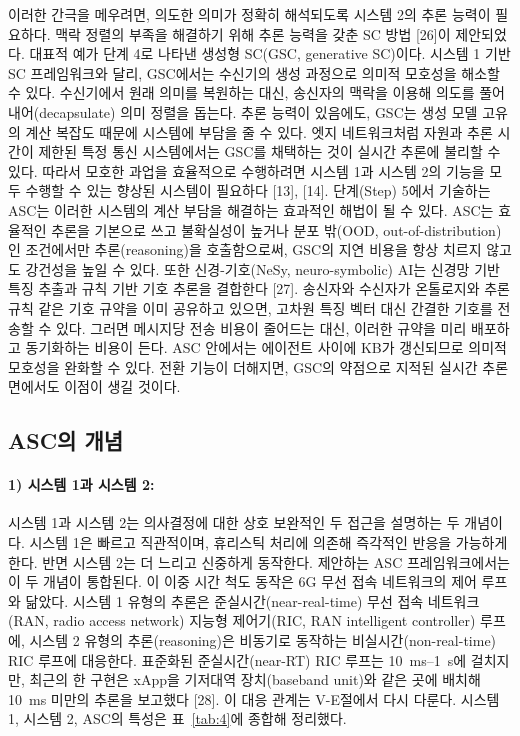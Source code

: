 이러한 간극을 메우려면, 의도한 의미가 정확히 해석되도록 시스템 2의 추론 능력이 필요하다. 맥락 정렬의 부족을 해결하기 위해 추론 능력을 갖춘 SC 방법 [26]이 제안되었다. 대표적 예가 단계 4로 나타낸 생성형 SC(GSC, generative SC)이다. 시스템 1 기반 SC 프레임워크와 달리, GSC에서는 수신기의 생성 과정으로 의미적 모호성을 해소할 수 있다. 수신기에서 원래 의미를 복원하는 대신, 송신자의 맥락을 이용해 의도를 풀어내어(decapsulate) 의미 정렬을 돕는다. 추론 능력이 있음에도, GSC는 생성 모델 고유의 계산 복잡도 때문에 시스템에 부담을 줄 수 있다. 엣지 네트워크처럼 자원과 추론 시간이 제한된 특정 통신 시스템에서는 GSC를 채택하는 것이 실시간 추론에 불리할 수 있다. 따라서 모호한 과업을 효율적으로 수행하려면 시스템 1과 시스템 2의 기능을 모두 수행할 수 있는 향상된 시스템이 필요하다 [13], [14]. 단계(Step) 5에서 기술하는 ASC는 이러한 시스템의 계산 부담을 해결하는 효과적인 해법이 될 수 있다. ASC는 효율적인 추론을 기본으로 쓰고 불확실성이 높거나 분포 밖(OOD, out-of-distribution)인 조건에서만 추론(reasoning)을 호출함으로써, GSC의 지연 비용을 항상 치르지 않고도 강건성을 높일 수 있다. 또한 신경-기호(NeSy, neuro-symbolic) AI는 신경망 기반 특징 추출과 규칙 기반 기호 추론을 결합한다 [27]. 송신자와 수신자가 온톨로지와 추론 규칙 같은 기호 규약을 이미 공유하고 있으면, 고차원 특징 벡터 대신 간결한 기호를 전송할 수 있다. 그러면 메시지당 전송 비용이 줄어드는 대신, 이러한 규약을 미리 배포하고 동기화하는 비용이 든다. ASC 안에서는 에이전트 사이에 KB가 갱신되므로 의미적 모호성을 완화할 수 있다. 전환 기능이 더해지면, GSC의 약점으로 지적된 실시간 추론 면에서도 이점이 생길 것이다.

\subsection{ASC의 개념}
\paragraph{1) 시스템 1과 시스템 2:} 시스템 1과 시스템 2는 의사결정에 대한 상호 보완적인 두 접근을 설명하는 두 개념이다. 시스템 1은 빠르고 직관적이며, 휴리스틱 처리에 의존해 즉각적인 반응을 가능하게 한다. 반면 시스템 2는 더 느리고 신중하게 동작한다. 제안하는 ASC 프레임워크에서는 이 두 개념이 통합된다. 이 이중 시간 척도 동작은 6G 무선 접속 네트워크의 제어 루프와 닮았다. 시스템 1 유형의 추론은 준실시간(near-real-time) 무선 접속 네트워크(RAN, radio access network) 지능형 제어기(RIC, RAN intelligent controller) 루프에, 시스템 2 유형의 추론(reasoning)은 비동기로 동작하는 비실시간(non-real-time) RIC 루프에 대응한다. 표준화된 준실시간(near-RT) RIC 루프는 10~ms--1~s에 걸치지만, 최근의 한 구현은 xApp을 기저대역 장치(baseband unit)와 같은 곳에 배치해 10~ms 미만의 추론을 보고했다 [28]. 이 대응 관계는 V-E절에서 다시 다룬다. 시스템 1, 시스템 2, ASC의 특성은 표~\ref{tab:4}에 종합해 정리했다.

